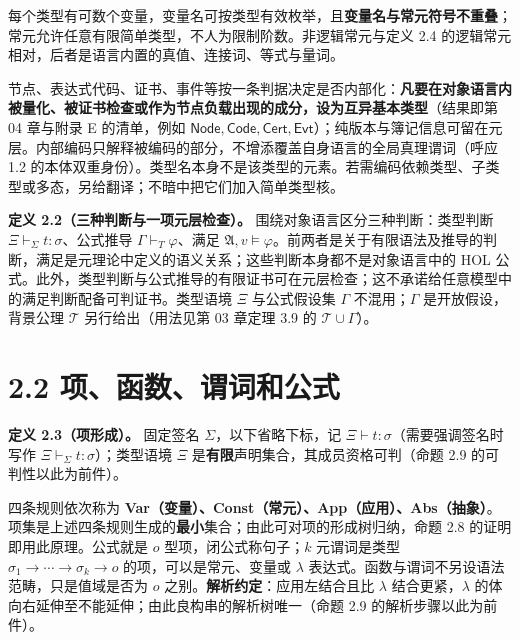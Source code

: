 \documentclass[UTF8,a4paper,zihao=-4,fontset=windows,openany]{ctexbook}
\newcommand{\mcsdisplay}[1]{%
  \par\addvspace{0.7em}%
  \sbox{\mcsmathbox}{\ensuremath{\displaystyle #1}}%
  \ifdim\wd\mcsmathbox>\linewidth
    \noindent\resizebox{\linewidth}{!}{\usebox{\mcsmathbox}}%
  \else
    \noindent\hspace*{\fill}\usebox{\mcsmathbox}\hspace*{\fill}%
  \fi
  \par\addvspace{0.7em}%
}
\def\ensuremath#1{#1}%
\begin{document}
每个类型有可数个变量，变量名可按类型有效枚举，且\textbf{变量名与常元符号不重叠}；常元允许任意有限简单类型，不人为限制阶数。非逻辑常元与定义 2.4 的逻辑常元相对，后者是语言内置的真值、连接词、等式与量词。

节点、表达式代码、证书、事件等按一条判据决定是否内部化：\textbf{凡要在对象语言内被量化、被证书检查或作为节点负载出现的成分，设为互异基本类型}（结果即第 04 章与附录 E 的清单，例如 \(\mathsf{Node},\mathsf{Code},\mathsf{Cert},\mathsf{Evt}\)）；纯版本与簿记信息可留在元层。内部编码只解释被编码的部分，不增添覆盖自身语言的全局真理谓词（呼应 1.2 的本体双重身份）。类型名本身不是该类型的元素。若需编码依赖类型、子类型或多态，另给翻译；不暗中把它们加入简单类型核。

\textbf{定义 2.2（三种判断与一项元层检查）。} 围绕对象语言区分三种判断：类型判断 \(\Xi\vdash_\Sigma t:\sigma\)、公式推导 \(\Gamma\vdash_T\varphi\)、满足 \(\mathfrak A,v\models\varphi\)。前两者是关于有限语法及推导的判断，满足是元理论中定义的语义关系；这些判断本身都不是对象语言中的 HOL 公式。此外，类型判断与公式推导的有限证书可在元层检查；这不承诺给任意模型中的满足判断配备可判证书。类型语境 \(\Xi\) 与公式假设集 \(\Gamma\) 不混用；\(\Gamma\) 是开放假设，背景公理 \(\mathcal T\) 另行给出（用法见第 03 章定理 3.9 的 \(\mathcal T\cup\Gamma\)）。

\section{2.2 项、函数、谓词和公式}
\textbf{定义 2.3（项形成）。} 固定签名 \(\Sigma\)，以下省略下标，记 \(\Xi\vdash t:\sigma\)（需要强调签名时写作 \(\Xi\vdash_\Sigma t:\sigma\)）；类型语境 \(\Xi\) 是\textbf{有限}声明集合，其成员资格可判（命题 2.9 的可判性以此为前件）。


\mcsdisplay{\frac{x:\sigma\in\Xi}{\Xi\vdash x:\sigma}\quad
\frac{c:\sigma\in\Sigma}{\Xi\vdash c:\sigma}\quad
\frac{\Xi\vdash f:\sigma\to\tau\quad\Xi\vdash u:\sigma}
{\Xi\vdash fu:\tau}\quad
\frac{\Xi,x:\sigma\vdash t:\tau}
{\Xi\vdash\lambda x:\sigma.t:\sigma\to\tau}.}
\noindent 四条规则依次称为 \textbf{Var（变量）、Const（常元）、App（应用）、Abs（抽象）}。项集是上述四条规则生成的\textbf{最小}集合；由此可对项的形成树归纳，命题 2.8 的证明即用此原理。公式就是 \(o\) 型项，闭公式称句子；\(k\) 元谓词是类型 \(\sigma_1\to\cdots\to\sigma_k\to o\) 的项，可以是常元、变量或 \(\lambda\) 表达式。函数与谓词不另设语法范畴，只是值域是否为 \(o\) 之别。\textbf{解析约定}：应用左结合且比 \(\lambda\) 结合更紧，\(\lambda\) 的体向右延伸至不能延伸；由此良构串的解析树唯一（命题 2.9 的解析步骤以此为前件）。
\end{document}
